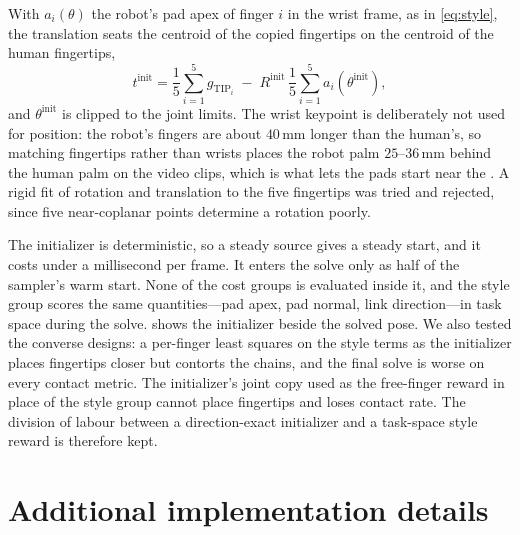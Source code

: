  With $a_i(\theta)$ the robot's pad apex of finger $i$ in the wrist frame, as in \cref{eq:style}, the translation seats the centroid of the copied fingertips on the centroid of the human fingertips,
\begin{equation}
\label{eq:init-seat}
t^{\mathrm{init}} = \frac{1}{5}\sum_{i=1}^{5} g_{\mathrm{TIP}_i} \;-\; R^{\mathrm{init}}\,\frac{1}{5}\sum_{i=1}^{5} a_i(\theta^{\mathrm{init}}),
\end{equation}
and $\theta^{\mathrm{init}}$ is clipped to the joint limits. The wrist keypoint is deliberately not used for position: the robot's fingers are about $40$\,mm longer than the human's, so matching fingertips rather than wrists places the robot palm $25$--$36$\,mm behind the human palm on the video clips, which is what lets the pads start near the \fcas. A rigid fit of rotation and translation to the five fingertips was tried and rejected, since five near-coplanar points determine a rotation poorly.

The initializer is deterministic, so a steady source gives a steady start, and it costs under a millisecond per frame. It enters the solve only as half of the sampler's warm start. None of the cost groups is evaluated inside it, and the style group scores the same quantities---pad apex, pad normal, link direction---in task space during the solve.  shows the initializer beside the solved pose. We also tested the converse designs: a per-finger least squares on the style terms as the initializer places fingertips closer but contorts the chains, and the final solve is worse on every contact metric. The initializer's joint copy used as the free-finger reward in place of the style group cannot place fingertips and loses contact rate. The division of labour between a direction-exact initializer and a task-space style reward is therefore kept.


\section{Additional \ours implementation details}
\label{app:details}

